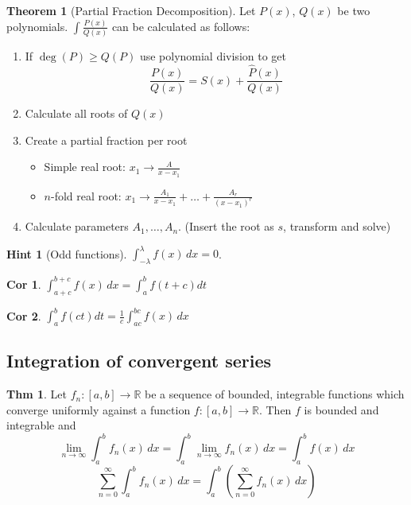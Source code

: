 \documentclass[a4paper, 10pt]{article}
\newtheorem*{corollary}{Cor}
\theoremstyle{definition}
\newtheorem*{theorem}{Thm}
\newtheorem*{note_wrapper}{Hint}
\theoremstyle{named}
\newtheorem*{ntheorem_wrapper}{Theorem}
\newenvironment{ntheorem}%
    {\begin{mdframed}[style=important]\begin{ntheorem_wrapper}}%
    {\end{ntheorem_wrapper}\end{mdframed}}
\newenvironment{note}%
    {\begin{mdframed}[style=trick]\begin{note_wrapper}}%
    {\end{note_wrapper}\end{mdframed}}
\newcommand{\R}{\mathbb{R}}
\begin{document}
\begin{ntheorem}[Partial Fraction Decomposition]
    Let $P(x)$, $Q(x)$ be two polynomials. $\int \frac{P(x)}{Q(x)}$ can be calculated as follows:
    \begin{enumerate}
        \item If $\deg(P) \geq Q(P)$ use polynomial division to get
        $$\frac{P(x)}{Q(x)} = S(x) + \frac{\hat{P}(x)}{Q(x)}$$
        \item Calculate all roots of $Q(x)$
        \item Create a partial fraction per root
        \begin{itemize}
            \item Simple real root: $x_1 \to \frac{A}{x - x_1}$
            \item $n$-fold real root: $x_1 \to \frac{A_1}{x - x_1} + \ldots + \frac{A_r}{(x - x_1)^r}$
        \end{itemize}
        \item Calculate parameters $A_1, \ldots, A_n$. (Insert the root as $s$, transform and solve)
    \end{enumerate}
\end{ntheorem}

\begin{note}[Odd functions]
    $\int_{-\lambda}^\lambda f(x) \, dx = 0$.
\end{note}

\begin{corollary}
    $\int_{a + c}^{b + c} f(x) \,dx = \int_a^b f(t + c) dt$
\end{corollary}

\begin{corollary}
    $\int_a^b f(ct) dt = \frac{1}{c} \int_{ac}^{bc} f(x) \,dx$
\end{corollary}

\subsection{Integration of convergent series}
\begin{theorem}
    Let $f_n: [a, b] \to \R$ be a sequence of bounded, integrable functions which converge uniformly against a function $f: [a, b] \to \R$. Then $f$ is bounded and integrable and
    $$\lim_{n \to \infty} \int_a^b f_n(x) \,dx = \int_a^b \lim_{n \to \infty}  f_n(x) \,dx = \int_a^b f(x) \,dx$$
    $$\sum_{n=0}^\infty \int_a^b f_n(x)\,dx = \int_a^b\left(\sum_{n=0}^\infty f_n(x)\,dx\right)$$
\end{theorem}
\end{document}
